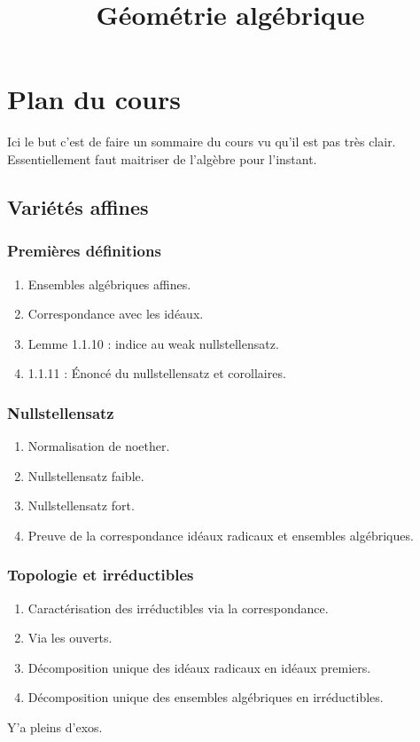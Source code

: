 \documentclass[a4paper,12pt]{book}
\title{Géométrie algébrique}
\date{}
\theoremstyle{plain}
\theoremstyle{definition}
\theoremstyle{remark}
\begin{document}
\maketitle
\tableofcontents


\chapter{Plan du cours}
Ici le but c'est de faire un sommaire du cours vu qu'il est pas très 
clair. Essentiellement faut maitriser de l'algèbre pour l'instant.


\section{Variétés affines}
\subsection{Premières définitions}

\begin{enumerate}
    \item Ensembles algébriques affines.
    \item Correspondance avec les idéaux.
    \item Lemme 1.1.10 : indice au weak nullstellensatz.
    \item 1.1.11 : Énoncé du nullstellensatz et corollaires.
\end{enumerate}
\subsection{Nullstellensatz}
\begin{enumerate}
    \item Normalisation de noether.
    \item Nullstellensatz faible.
    \item Nullstellensatz fort.
    \item Preuve de la correspondance idéaux radicaux et ensembles
	algébriques.
\end{enumerate}

\subsection{Topologie et irréductibles}
\begin{enumerate}
    \item Caractérisation des irréductibles via la correspondance.
    \item Via les ouverts.
    \item Décomposition unique des idéaux radicaux en idéaux premiers.
    \item Décomposition unique des ensembles algébriques en 
	irréductibles.
\end{enumerate}
Y'a pleins d'exos.
\end{document}
